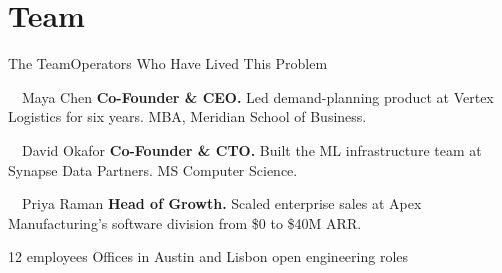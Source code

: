 \section{Team}

\begin{frame}{The Team}{Operators Who Have Lived This Problem}

  \begin{minipage}[t]{0.31\textwidth}
    \begin{panelbox}{\textcolor{accentMint}{\faUser}\ \ Maya Chen}
      \small \textbf{Co-Founder \& CEO.} Led demand-planning product at Vertex Logistics
      for six years. MBA, Meridian School of Business.
    \end{panelbox}
  \end{minipage}\hfill
  \begin{minipage}[t]{0.31\textwidth}
    \begin{panelbox}{\textcolor{accentMint}{\faUser}\ \ David Okafor}
      \small \textbf{Co-Founder \& CTO.} Built the ML infrastructure team at Synapse
      Data Partners. MS Computer Science.
    \end{panelbox}
  \end{minipage}\hfill
  \begin{minipage}[t]{0.31\textwidth}
    \begin{panelbox}{\textcolor{accentMint}{\faUser}\ \ Priya Raman}
      \small \textbf{Head of Growth.} Scaled enterprise sales at Apex Manufacturing's
      software division from \$0 to \$40M ARR.
    \end{panelbox}
  \end{minipage}
  \par

  \vspace{0.55cm}
  \centering
  {\small\textcolor{textMuted}{12 employees \quad\textbullet{}\quad Offices in Austin and Lisbon \quad\textbullet{} open engineering roles}}

\end{frame}

